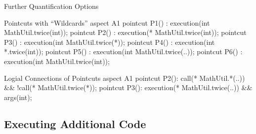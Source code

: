 \begin{frame}[fragile]{Further Quantification Options}
	\begin{mycolumns}[widths={70,30},animation=none]
\begin{codetight}{Pointcuts with ``Wildcards''}
aspect A1 {
	pointcut P1() : execution(int MathUtil.twice(int));
	pointcut P2() : execution(* MathUtil.twice(int));
	pointcut P3() : execution(int MathUtil.twice(*));
	pointcut P4() : execution(int *.twice(int));
	pointcut P5() : execution(int MathUtil.twice(..));
	pointcut P6() : execution(int MathUtil.twice(int));
}
\end{codetight}
\begin{codetight}{Logial Connections of Pointcuts}
aspect A1 {
	pointcut P2(): call(* MathUtil.*(..)) && !call(* MathUtil.twice(*));
	pointcut P3(): execution(* MathUtil.twice(..)) && args(int);
}
\end{codetight}
	\mynextcolumn
	\end{mycolumns}
\end{frame}

\subsection{Executing Additional Code}

